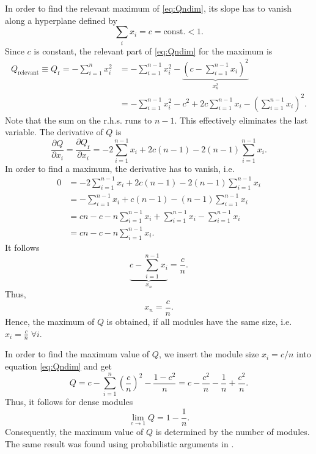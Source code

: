 In order to find the relevant maximum of \eqref{eq:Qndim}, its slope has to vanish along a hyperplane defined by
\begin{equation}\label{qmehrdimbedingung}
\sum _i x_i = c = \text{const.} <1.
\end{equation}
%
Since $c$ is constant, the relevant part of \eqref{eq:Qndim} for the maximum is
\begin{align}
Q_{\text{relevant}}\equiv Q_\text{r}= -\sum _{i=1}^n x_i^2&=-\sum _{i=1}^{n-1} x_i^2- \underbrace{ \left( 
c-\sum _{i=1}^{n-1} x_i \right) ^2 }_{x_n^2} \label{eq:relevant_Q}\\
&= -\sum _{i=1}^{n-1} x_i^2 - c^2 + 2c\sum _{i=1}^{n-1} x_i -\left( \sum _{i=1}^{n-1} x_i \right) ^2. \nonumber
\end{align}
Note that the sum on the r.h.s. runs to $n-1$.
This effectively eliminates the last variable.
The derivative of $Q$ is
\begin{equation}
\frac{\partial Q}{\partial x_i}= \frac{\partial Q_\text{r}}{\partial x_i}=- 2\sum _{i=1}^{n-1} x_i + 2c(n-1)-2 (n-1) \sum _{i=1}^{n-1} x_i.
\end{equation}
%
In order to find a maximum, the derivative has to vanish, i.e.
\begin{align*}
0&=- 2\sum _{i=1}^{n-1} x_i + 2c(n-1)-2 (n-1) \sum _{i=1}^{n-1} x_i \\
&=- \sum _{i=1}^{n-1} x_i + c(n-1) - (n-1) \sum _{i=1}^{n-1} x_i \\
 &= cn-c-n\sum _{i=1}^{n-1} x_i +\sum _{i=1}^{n-1} x_i -\sum _{i=1}^{n-1} x_i\\
 &= cn-c-n\sum _{i=1}^{n-1} x_i .
\end{align*}
It follows
\[
\underbrace{c-\sum _{i=1}^{n-1} x_i}_{x_n} =\frac{c}{n}.
\]
Thus,
\begin{equation}
x_n=\frac{c}{n}.
\end{equation}
Hence, the maximum of $Q$ is obtained, if all modules have the same size, i.e. $x_i=\frac{c}{n} \; \forall i$.

In order to find the maximum value of $Q$, we insert the module size $x_i=c/n$ into equation \eqref{eq:Qndim} and get
\[
Q=c-\sum _{i=1} ^n \left( \frac{c}{n} \right) ^2 - \frac{1-c^2}{n}=c-\frac{c^2}{n}-\frac{1}{n}+\frac{c^2}{n}.
\]
Thus, it follows for dense modules
\begin{equation}
\lim _{c\rightarrow 1}Q=1-\frac{1}{n}.
\end{equation}
Consequently, the maximum value of $Q$ is determined by the number of modules.
The same result was found using probabilistic arguments in \citep{Good2010}.

